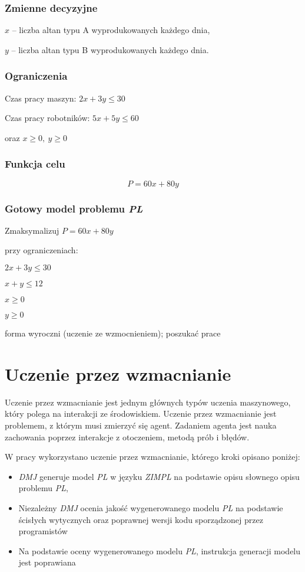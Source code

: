 \subsubsection*{Zmienne decyzyjne}

$x$ – liczba altan typu A wyprodukowanych każdego dnia,

$y$ – liczba altan typu B wyprodukowanych każdego dnia.

\subsubsection*{Ograniczenia}

Czas pracy maszyn: $2x + 3y \leq 30$

Czas pracy robotników: $5x + 5y \leq 60$

oraz $x \geq 0, \ y \geq 0$


\subsubsection*{Funkcja celu}
\[
    P = 60x + 80y
\]

\subsubsection*{Gotowy model problemu \textit{PL}}
    Zmaksymalizuj $P = 60x + 80y$

przy ograniczeniach:

    $2x + 3y \leq 30$
    
    $x + y \leq 12$
    
    $x  \geq 0$
    
    $y \geq 0$

forma wyroczni (uczenie ze wzmocnieniem); poszukać prace

\section{Uczenie przez wzmacnianie}
Uczenie przez wzmacnianie jest jednym głównych typów uczenia maszynowego, który polega na interakcji ze środowiskiem. Uczenie przez wzmacnianie jest problemem, z którym musi zmierzyć się agent. Zadaniem agenta jest nauka zachowania poprzez interakcje z otoczeniem, metodą prób i błędów.\cite{kaelbling1996reinforcement}

W pracy wykorzystano uczenie przez wzmacnianie, którego kroki opisano poniżej:
\begin{itemize}
    \item \textit{DMJ} generuje model \textit{PL} w języku \textit{ZIMPL} na podstawie opisu słownego opisu problemu \textit{PL},
    \item Niezależny \textit{DMJ} ocenia jakość wygenerowanego modelu \textit{PL} na podstawie ścisłych wytycznych oraz poprawnej wersji kodu sporządzonej przez programistów
    \item Na podstawie oceny wygenerowanego modelu \textit{PL}, instrukcja generacji modelu jest poprawiana
\end{itemize}

